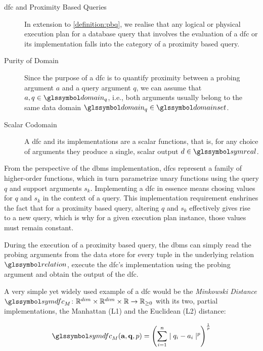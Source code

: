 \begin{description}
    \item[\acrshort{dfc} and Proximity Based Queries] In extension to \cref{definition:pbq}, we realise that any logical or physical execution plan for a database query that involves the evaluation of a \acrshort{dfc} or its implementation falls into the category of a proximity based query.

    \item[Purity of Domain] Since the purpose of a \acrshort{dfc} is to quantify proximity between a probing argument $a$ and a query argument $q$, we can assume that $a, q \in \domain_q$, i.e., both arguments usually belong to the same data domain $\domain_q \in \domainset$.

    \item[Scalar Codomain] A \acrshort{dfc} and its implementations are a scalar functions, that is, for any choice of arguments they produce a single, scalar output $d \in \symreal$. 
\end{description}

From the perspective of the \acrshort{dbms} implementation, \acrshort{dfc}s represent a family of higher-order functions, which in turn parametrize unary functions using the query $q$ and support arguments $s_k$. Implementing a \acrshort{dfc} in essence means chosing values for $q$ and $s_k$ in the context of a query. This implementation requirement enshrines the fact that for a proximity based query, altering $q$ and $s_k$ effectively gives rise to a new query, which is why for a given execution plan instance, those values must remain constant. 

During the execution of a proximity based query, the \acrshort{dbms} can simply read the probing arguments from the data store for every tuple in the underlying relation $\relation$, execute the \acrshort{dfc}'s implementation using the probing argument and obtain the output of the \acrshort{dfc}.

A very simple yet widely used example of a \acrshort{dfc} would be the \emph{Minkowski Distance} $\symdfc_{M} \colon \mathbb{R}^{dim} \times \mathbb{R}^{dim} \times \mathbb{R} \to \mathbb{R}_{\geq 0}$ with its two, partial implementations, the Manhattan (L1) and the Euclidean (L2) distance:

\begin{equation}
    \symdfc_{M}(\mathbf{a},\mathbf{q},p) = \left(\sum_{i=1}^{n} \mid q_i - a_i \mid^p\right)^{\frac{1}{p}}
\end{equation}

